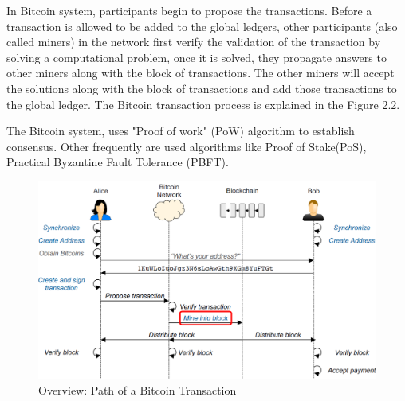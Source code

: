 In Bitcoin system, participants begin to propose the transactions. Before a transaction is allowed to be added to the global ledgers, other participants (also called miners) in the network first verify the validation of the transaction by solving a computational problem, once it is solved, they propagate answers to other miners along with the block of transactions. The other miners will accept the solutions along with the block of transactions and add those transactions to the global ledger. The Bitcoin transaction process is explained in the Figure 2.2.

The Bitcoin system, uses "Proof of work" (PoW) algorithm to establish consensus. Other frequently are used algorithms like Proof of Stake(PoS),  Practical Byzantine Fault Tolerance (PBFT).

\begin{figure}[!htb]%
	\includegraphics[width=\textwidth]{charts/BitcoinTx}
	\caption{Overview: Path of a Bitcoin Transaction\cite{sn}}
\end{figure}

